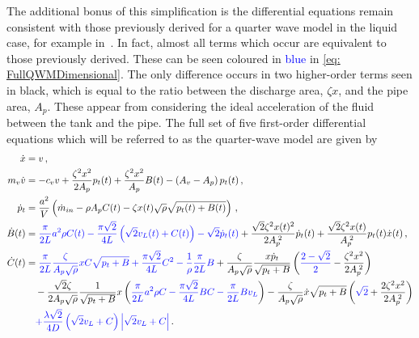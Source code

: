 The additional bonus of this simplification is the differential equations remain consistent with those previously derived for a quarter wave model in the liquid case, for example in~\cite{Hos2015ModelPipe}. In fact, almost all terms which occur are equivalent to those previously derived. These can be seen coloured in \textcolor{Blue}{blue} in \cref{eq: FullQWMDimensional}. The only difference occurs in two higher-order terms seen in black, which is equal to the ratio between the discharge area, $\zeta x$, and the pipe area, $A_p$. These appear from considering the ideal acceleration of the fluid between the tank and the pipe. The full set of five first-order differential equations which will be referred to as the quarter-wave model are given by
~
\begin{equation} \label{eq: FullQWMDimensional}
\begin{split}
    \dot{x} &= v \, , \\
    m_v \dot{v} &= - c_v v + \frac{\zeta^2 x^2}{2 A_p} p_t(t) + \frac{\zeta^2 x^2}{A_p} B(t) - \left( A_v - A_p \right) p_t(t)
    \, , \\
    \dot{p}_t &= \frac{a^2}{V} \left( \dot{m}_{in} - \rho A_p C(t) - \zeta x(t) \sqrt{\rho} \sqrt{p_t(t) + B(t)} \right)
    \, , \\
    \dot{B}(t) &= \textcolor{Blue}{
    \frac{\pi}{2L} a^2 \rho C(t) - \frac{\pi \sqrt{2}}{4L} \left( \sqrt{2} v_L(t) + C(t) \right) - \sqrt{2} \dot{p}_t(t)} + \frac{\sqrt{2} \zeta^2 x(t)^2}{2 A_p\power{2}} \dot{p}_t(t) + \frac{\sqrt{2} \zeta^2 x(t)}{A_p\power{2}} p_t(t) \dot{x}(t)
    \, , \\
    \dot{C}(t) &=
    \textcolor{Blue}{
    \frac{\pi}{2L} \frac{\zeta}{A_p \sqrt{\rho}} x C \sqrt{p_t + B}
    + \frac{\pi \sqrt{2}}{4 L} C^2
    - \frac{1}{\rho} \frac{\pi}{2L} B
    }
    + \frac{\zeta}{A_p \sqrt{\rho}} \frac{x \dot{p}_t}{\sqrt{p_t+B}} \left( 
    \textcolor{Blue}{\frac{2 - \sqrt{2}}{2}} -
    \frac{\zeta^2 x^2}{2 A_p\power{2}} \right)
    \\ & \quad %
    - \frac{\sqrt{2} \zeta}{2 A_p \sqrt{\rho}} \frac{1}{\sqrt{p_t+B}} x \left(
    \textcolor{Blue}{
    \frac{\pi}{2L} a^2 \rho C
    - \frac{\pi \sqrt{2}}{4 L} B C
    - \frac{\pi}{2L} B v_L }
    \right)
    - \frac{\zeta}{A_p \sqrt{\rho}} \dot{x} \sqrt{p_t + B} \left( 
    \textcolor{Blue}{\sqrt{2}} +
    \frac{2 \zeta^2 x^2}{2 A_p\power{2}}
    \right)
    \\ & \quad %
    \textcolor{Blue}{
    + \frac{\lambda \sqrt{2}}{4 D} \left( \sqrt{2} v_L + C \right) \left| \sqrt{2} v_L + C \right| }
    \, .
\end{split}
\end{equation}

